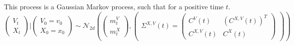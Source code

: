 This process is a Gaussian Markov process, such that for a positive time $t$.
$$\begin{pmatrix}
V_{t}\\
X_{t}
\end{pmatrix} \vert \begin{pmatrix}
V_{0} = v_0 \\
X_{0} = x_0
\end{pmatrix} \sim \mathcal{N}_{2d}\left( \begin{pmatrix}
m^V_{t}\\
m^X_{t}
\end{pmatrix}, \begin{pmatrix}
\Sigma^{X, V}(t) = \begin{pmatrix}
C^{V}(t) & \left(C^{X, V}(t)\right)^T\\
C^{X, V}(t) & C^{X}(t)
\end{pmatrix}
\end{pmatrix} \right)$$

